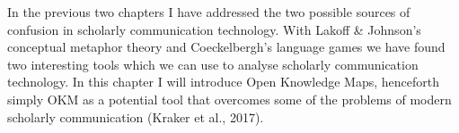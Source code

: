 In the previous two chapters I have addressed the two possible sources of confusion in scholarly communication technology. With Lakoff & Johnson’s conceptual metaphor theory and Coeckelbergh’s language games we have found two interesting tools which we can use to analyse scholarly communication technology. In this chapter I will introduce Open Knowledge Maps, henceforth simply OKM as a potential tool that overcomes some of the problems of modern scholarly communication (Kraker et al., 2017).